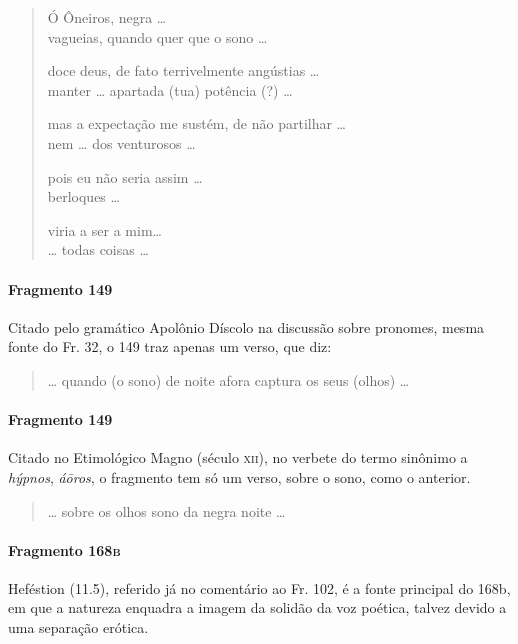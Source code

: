 {\begin{verse}
Ó Ôneiros, negra \ldots{}\\
vagueias, quando quer que o sono \ldots{}

doce deus, de fato terrivelmente angústias \ldots{}\\
manter \ldots{} apartada (tua) potência (?) \ldots{}

mas a expectação me sustém, de não partilhar \ldots{}\\
nem \ldots{}  dos venturosos \ldots{}

pois eu não seria assim \ldots{}\\
berloques \ldots{}

viria a ser a mim\ldots{}\\
\ldots{} todas coisas \ldots{}
\end{verse}


\paragraph{Fragmento 149}

{\small Citado pelo gramático Apolônio Díscolo na discussão sobre pronomes, mesma fonte do Fr. 32, o 149 traz apenas um verso, que diz:}

\begin{verse}
\ldots{} quando (o sono) de noite afora captura os seus (olhos) \ldots{}
\end{verse}

\paragraph{Fragmento 149}

 {\small Citado no Etimológico Magno (século \textsc{xii}), no verbete do termo sinônimo a \textit{hýpnos}, \textit{áōros}, o fragmento tem só um verso, sobre o sono, como o anterior.}

\begin{verse}
\ldots{} sobre os olhos sono da negra noite \ldots{}
\end{verse}

\paragraph{Fragmento 168\textsc{b}}

{\small Heféstion (11.5), referido já no comentário ao Fr. 102, é a fonte principal do 168b, em que a natureza enquadra a imagem da solidão da voz poética, talvez devido a uma separação erótica.}

}
